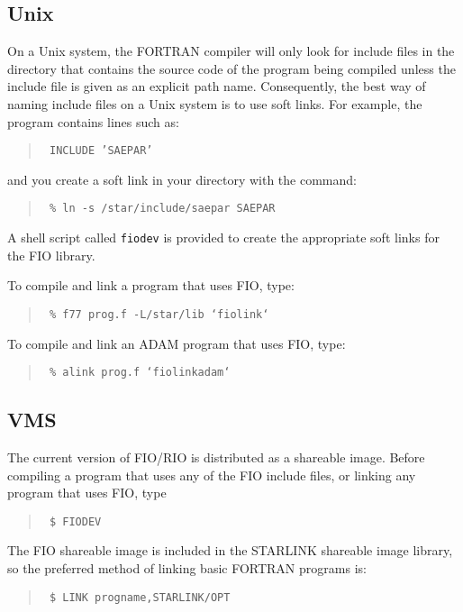 \documentclass[twoside,11pt]{article}
\renewcommand{\_}{\texttt{\symbol{95}}}
\begin{document}
\subsection{Unix}

On a Unix system, the FORTRAN compiler will only look for include files in the
directory that contains the source code of the program being compiled unless
the include file is given as an explicit path name. Consequently, the best way
of naming include files on a Unix system is to use soft links. For example, the
program contains lines such as:

\begin{quote}{\tt
      INCLUDE 'SAE\_PAR'
}
\end{quote}

and you create a soft link in your directory with the command:

\begin{quote}{\tt
\% ln -s /star/include/sae\_par SAE\_PAR
}
\end{quote}

A shell script called {\tt fio\_dev} is provided to create the appropriate soft
links for the FIO library.

To compile and link a program that uses FIO, type:

\begin{quote}{\tt
\% f77 prog.f -L/star/lib `fio\_link`
}
\end{quote}

To compile and link an ADAM program that uses FIO, type:

\begin{quote}{\tt
\% alink prog.f `fio\_link\_adam`
}
\end{quote}

\subsection{VMS}

The current version of FIO/RIO is distributed as a shareable image. Before
compiling a program that uses any of the FIO include files, or linking any
program that uses FIO, type 

\begin{quote}{\tt
\$ FIO\_DEV
}
\end{quote}

The FIO shareable image is included in the STAR\_LINK shareable image library,
so the preferred method of linking basic FORTRAN programs is:

\begin{quote}{\tt
\$ LINK progname,STAR\_LINK/OPT
}
\end{quote}
\end{document}
